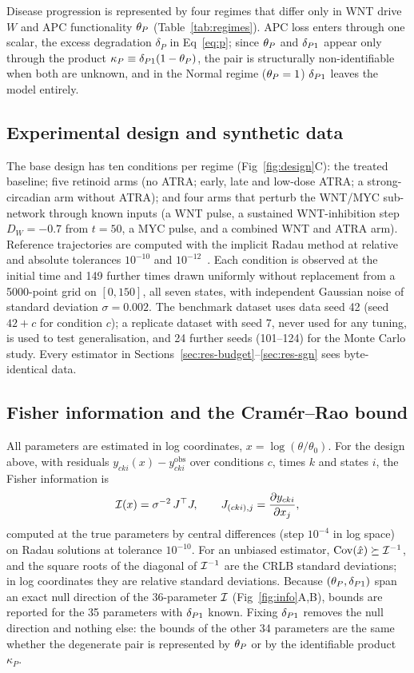 Disease progression is represented by four regimes that differ only in WNT drive
$W$ and APC functionality $\theta_P$ (Table~\ref{tab:regimes}). APC loss enters
through one scalar, the excess degradation $\delta_P$ in Eq~\eqref{eq:p}; since
$\theta_P$ and $\delta_{P1}$ appear only through the product $\kappa_P\equiv\delta_{P1}(1-\theta_P)$,
the pair is structurally non-identifiable when both are unknown, and in the
Normal regime ($\theta_P=1$) $\delta_{P1}$ leaves the model entirely.

\subsection{Experimental design and synthetic data}
\label{sec:data}

The base design has ten conditions per regime (Fig~\ref{fig:design}C): the
treated baseline; five retinoid arms (no ATRA; early, late and low-dose ATRA; a
strong-circadian arm without ATRA); and four arms that perturb the WNT/MYC
sub-network through known inputs (a WNT pulse, a sustained WNT-inhibition step
$D_W=-0.7$ from $t=50$, a MYC pulse, and a combined WNT and ATRA arm). Reference
trajectories are computed with the implicit Radau method at relative and
absolute tolerances $10^{-10}$ and
$10^{-12}$~\citep{virtanen2020scipy}. Each condition is observed at the initial
time and 149 further times drawn uniformly without replacement from a
5000-point grid on $[0,150]$, all seven states, with independent Gaussian noise
of standard deviation $\sigma=0.002$. The benchmark dataset uses data seed 42
(seed $42+c$ for condition $c$); a replicate dataset with seed 7, never used
for any tuning, is used to test generalisation, and 24 further seeds
(101--124) for the Monte Carlo study. Every estimator in
Sections~\ref{sec:res-budget}--\ref{sec:res-sgn} sees byte-identical data.

\subsection{Fisher information and the Cram\'er--Rao bound}
\label{sec:m-fim}

All parameters are estimated in log coordinates, $x=\log(\theta/\theta_0)$.
For the design above, with residuals $y_{cki}(x) - y^{\text{obs}}_{cki}$ over
conditions $c$, times $k$ and states $i$, the Fisher information is
\begin{equation}
\mathcal{I}(x) = \sigma^{-2}\,J^{\top}J, \qquad J_{(cki),j} = \frac{\partial y_{cki}}{\partial x_j},
\label{eq:fim}
\end{equation}
computed at the true parameters by central differences (step $10^{-4}$ in log
space) on Radau solutions at tolerance $10^{-10}$. For an unbiased estimator,
$\mathrm{Cov}(\hat x)\succeq\mathcal{I}^{-1}$, and the square roots of the diagonal of
$\mathcal{I}^{-1}$ are the CRLB standard deviations; in log coordinates they are
relative standard deviations. Because $(\theta_P,\delta_{P1})$ span an exact null direction
of the 36-parameter $\mathcal{I}$ (Fig~\ref{fig:info}A,B), bounds are reported for the
35 parameters with $\delta_{P1}$ known. Fixing $\delta_{P1}$ removes the null direction and
nothing else: the bounds of the other 34 parameters are the same whether the
degenerate pair is represented by $\theta_P$ or by the identifiable product
$\kappa_P$.

